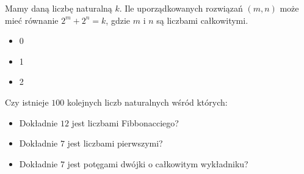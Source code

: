 \documentclass[12pt, a4paper]{article}
\newcommand{\question}[1]{\normalitem \begin{samepage}#1 \end{samepage}}
\newcommand{\cmark}{\textcolor{green}{T}}%
\newcommand{\xmark}{\textcolor{red}{N}}%
\newcommand{\yes}{\rlap{\framebox(15,15)} {\raisebox{2pt}{\large\hspace{-1pt}\cmark}}%
\hspace{3pt}}
\newcommand{\no}{\rlap{\framebox(15,15)} {\raisebox{2pt}{\large\hspace{-1pt}\xmark}}%
\hspace{3pt}}
\begin{document}
\begin{enumerate}
	\question{
	    Mamy daną liczbę naturalną $k$. Ile uporządkowanych rozwiązań $(m,n)$ może mieć równanie $2^m+2^n=k$, gdzie $m$ i $n$ są liczbami całkowitymi.
	    
	    \begin{itemize}
	        \item [\yes]0
	        \item [\yes]1
	        \item [\yes]2
	    \end{itemize}
	}
	
	\question {
		Czy istnieje $100$ kolejnych liczb naturalnych wśród których:
		
		\begin{itemize}
			\item [\no]Dokładnie $12$ jest liczbami Fibbonacciego?
			\item [\yes]Dokładnie $7$ jest liczbami pierwszymi?
			\item [\yes]Dokładnie $7$ jest potęgami dwójki o całkowitym wykładniku?
		\end{itemize}
		
	}
	
\end{enumerate}
\end{document}
